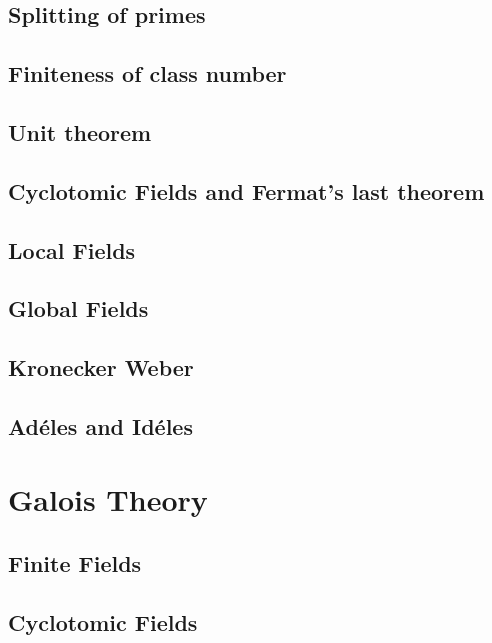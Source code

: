 \documentclass[oneside, 12pt, ]{scrbook}
\theoremstyle{theorem}
\begin{document}
\chapter{Splitting of primes}

\chapter{Finiteness of class number}

\chapter{Unit theorem}

\chapter{Cyclotomic Fields and Fermat's last theorem}

\chapter{Local Fields}

\chapter{Global Fields}

\chapter{Kronecker Weber}


\chapter{Ad\'{e}les and Id\'{e}les}




\part{Galois Theory}



\chapter{Finite Fields}


\chapter{Cyclotomic Fields}
\end{document}

